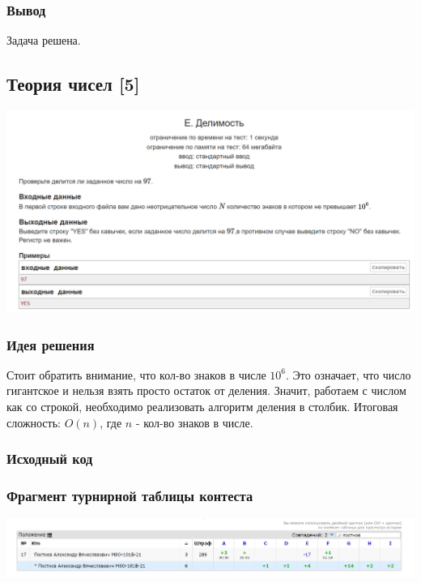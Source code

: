 \subsubsection*{Вывод}
Задача решена.

\vspace{20pt}

\pagebreak

\subsection*{Теория чисел [5]}
\begin{center}
\includegraphics[width=\textwidth]{statements/5.png}
\end{center}
\subsubsection*{Идея решения}
Стоит обратить внимание, что кол-во знаков в числе $10^6$. Это означает, что число гигантское и нельзя взять просто остаток от деления. Значит, работаем с числом как со строкой, необходимо реализовать алгоритм деления в столбик. Итоговая сложность: $O(n)$, где $n$ - кол-во знаков в числе.

\subsubsection*{Исходный код}


\subsubsection*{Фрагмент турнирной таблицы контеста}
\begin{center}
\includegraphics[width=\textwidth]{standings/5.png}\newline\noindent
\end{center}


